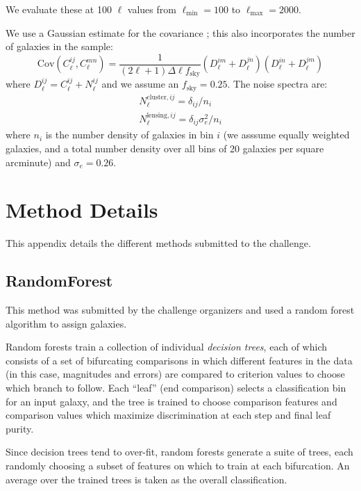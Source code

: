 \documentclass[twocolumn,twocolappendix]{aastex63}
\begin{document}
We evaluate these at 100 $\ell$ values from $\ell_\mathrm{min}=100$ to $\ell_\mathrm{max}=2000$.

We use a Gaussian estimate for the covariance \citep{takada_jain}; this also incorporates the number of galaxies in the
sample:
\begin{equation}
    \mathrm{Cov}(C^{ij}_\ell, C^{mn}_\ell) = \frac{1}{(2 \ell + 1)\Delta\ell f_\mathrm{sky}}(D^{im}_\ell + D^{jn}_\ell)(D^{in}_\ell + D^{jm}_\ell)
\end{equation}
where $D^{ij}_\ell = C^{ij}_\ell + N^{ij}_\ell$ and we assume an $f_\mathrm{sky}=0.25$.  The noise spectra are:
\begin{align}
N^{\mathrm{cluster},ij}_\ell = \delta_{ij} / n_i \\
N^{\mathrm{lensing},ij}_\ell = \delta_{ij} \sigma_e^2 / n_i
\end{align}
where $n_i$ is the number density of galaxies in bin $i$ (we asssume equally weighted galaxies, and a 
total number density over all bins of 20 galaxies per square arcminute) and $\sigma_e=0.26$.



\section{Method Details} \label{app:methods}
This appendix details the different methods submitted to the challenge.

\subsection{ {\sc RandomForest} } \label{sec:randomforest}
This method was submitted by the challenge organizers and used a random
forest algorithm to assign galaxies.

Random forests \citep{breiman2001} train a collection of individual \emph{decision trees},
each of which consists of a set of bifurcating comparisons in which different features in
the data (in this case, magnitudes and errors) are compared to criterion values to choose
which branch to follow.  Each ``leaf'' (end comparison) selects a classification bin for
an input galaxy, and the tree is trained to choose comparison features and comparison values
which maximize discrimination at each step and final leaf purity.

Since decision trees tend to over-fit, random forests generate a suite of 
trees, each randomly choosing a subset of features on which to train at each bifurcation.
An average over the trained trees is taken as the overall classification.
\end{document}
